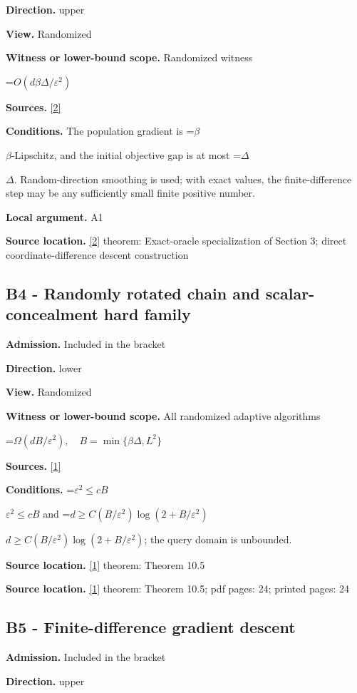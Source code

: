 \documentclass[10pt,a4paper]{article}
\newcommand{\AtlasMath}[1]{\par\begingroup\centering\setbox0=\hbox{$\displaystyle #1$}\ifdim\wd0>1.4\linewidth\typeout{ATLAS WIDE FORMULA: \the\wd0}\fi\ifdim\wd0>\linewidth\resizebox{\linewidth}{!}{\box0}\else\box0\fi\par\endgroup}
\newcommand{\AtlasInlineMath}[1]{\begingroup\setbox0=\hbox{$#1$}\ifdim\wd0>.4\linewidth\endgroup\AtlasMath{#1}\else\endgroup$#1$\fi}
\begin{document}
\textbf{Direction.} upper

\textbf{View.} Randomized

\textbf{Witness or lower-bound scope.} Randomized witness

\AtlasMath{O(d\beta \Delta/\varepsilon^2)}
\textbf{Sources.} \href{https://arxiv.org/pdf/1309.5549}{[2]}

\textbf{Conditions.} The population gradient is \AtlasInlineMath{\beta}-Lipschitz, and the initial objective gap is at most \AtlasInlineMath{\Delta}. Random-direction smoothing is used; with exact values, the finite-difference step may be any sufficiently small finite positive number.

\textbf{Local argument.} A1

\textbf{Source location.} \href{https://arxiv.org/pdf/1309.5549}{[2]} theorem: Exact-oracle specialization of Section 3; direct coordinate-difference descent construction

\subsection{B4 - Randomly rotated chain and scalar-concealment hard family}
\textbf{Admission.} Included in the bracket

\textbf{Direction.} lower

\textbf{View.} Randomized

\textbf{Witness or lower-bound scope.} All randomized adaptive algorithms

\AtlasMath{\Omega(dB/\varepsilon^2),\quad B=\min\{\beta \Delta,L^2\}}
\textbf{Sources.} \href{https://arxiv.org/html/2610.19652v1}{[1]}

\textbf{Conditions.} \AtlasInlineMath{\varepsilon^2\le cB} and \AtlasInlineMath{d\ge C(B/\varepsilon^2)\log(2+B/\varepsilon^2)}; the query domain is unbounded.

\textbf{Source location.} \href{https://arxiv.org/html/2610.19652v1}{[1]} theorem: Theorem 10.5

\textbf{Source location.} \href{https://arxiv.org/html/2610.19652v1}{[1]} theorem: Theorem 10.5; pdf pages: 24; printed pages: 24

\subsection{B5 - Finite-difference gradient descent}
\textbf{Admission.} Included in the bracket

\textbf{Direction.} upper
\end{document}

